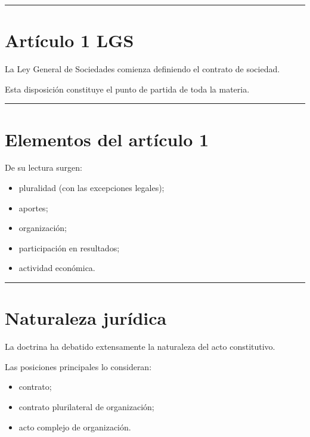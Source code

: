 \documentclass[
  spanish,
  letterpaper,
  DIV=11,
  numbers=noendperiod]{scrartcl}
\providecommand{\tightlist}{%
  \setlength{\itemsep}{0pt}\setlength{\parskip}{0pt}}
\begin{document}
\begin{center}\rule{0.5\linewidth}{0.5pt}\end{center}

\section{Artículo 1 LGS}\label{artuxedculo-1-lgs}

La Ley General de Sociedades comienza definiendo el contrato de
sociedad.

Esta disposición constituye el punto de partida de toda la materia.

\begin{center}\rule{0.5\linewidth}{0.5pt}\end{center}

\section{Elementos del artículo 1}\label{elementos-del-artuxedculo-1}

De su lectura surgen:

\begin{itemize}
\tightlist
\item
  pluralidad (con las excepciones legales);
\item
  aportes;
\item
  organización;
\item
  participación en resultados;
\item
  actividad económica.
\end{itemize}

\begin{center}\rule{0.5\linewidth}{0.5pt}\end{center}

\section{Naturaleza jurídica}\label{naturaleza-juruxeddica}

La doctrina ha debatido extensamente la naturaleza del acto
constitutivo.

Las posiciones principales lo consideran:

\begin{itemize}
\tightlist
\item
  contrato;
\item
  contrato plurilateral de organización;
\item
  acto complejo de organización.
\end{itemize}
\end{document}
